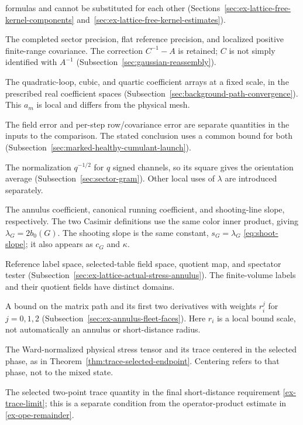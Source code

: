 \begin{description}
formulas and cannot be substituted for each other
(Sections~\ref{sec:ex-lattice-free-kernel-components} and~\ref{sec:ex-lattice-free-kernel-estimates}).
\item[$A$, $A_0$, $C$ in Gaussian reassembly] The completed sector
precision, flat reference precision, and localized positive finite-range
covariance. The correction $C^{-1}-A$ is retained; $C$ is not simply
identified with $A^{-1}$ (Subsection~\ref{sec:gaussian-reassembly}).
\item[$a_m,b_m,c_m$ in background paths] The quadratic-loop, cubic,
and quartic coefficient arrays at a fixed scale, in the prescribed
real coefficient spaces (Subsection~\ref{sec:background-path-convergence}).
This $a_m$ is local and differs from the physical mesh.
\item[$\varepsilon$ in the healthy-field comparison] The field error and
per-step row/covariance error are separate quantities in the inputs to the
comparison. The stated conclusion uses a common bound for both
(Subsection~\ref{sec:marked-healthy-cumulant-launch}).
\item[$\lambda$ in the sector calculation] The normalization $q^{-1/2}$
for $q$ signed channels, so its square gives the orientation average
(Subsection~\ref{sec:sector-gram}). Other local uses of $\lambda$ are
introduced separately.
\item[$\lambda_G$, $b_0(G)$, $s_G$] The annulus coefficient,
canonical running coefficient, and shooting-line slope, respectively.
The two Casimir definitions use the same color inner product, giving
$\lambda_G=2b_0(G)$. The shooting slope is the same constant,
$s_G=\lambda_G$ \eqref{eq:shoot-slope}; it also appears as $c_G$ and
$\kappa$.
\item[$E_d$, $\mathcal F_d$, $\pi_d$, $\tau_{I,D}$ in the annulus]
Reference label space, selected-table field space, quotient map, and
spectator tester (Subsection~\ref{sec:ex-lattice-actual-stress-annulus}).
The finite-volume labels and their quotient fields have distinct domains.
\item[$\mathsf P_r(M;C)$ in the annular estimate] A bound on the matrix path and its first two
derivatives with weights $r_i^j$ for $j=0,1,2$
(Subsection~\ref{sec:ex-annulus-fleet-faces}). Here $r_i$ is a local bound
scale, not automatically an annulus or short-distance radius.
\item[$T_{\mu\nu}$, $\Theta$] The Ward-normalized physical stress
tensor and its trace centered in the selected phase, as in
Theorem~\ref{thm:trace-selected-endpoint}. Centering refers to that
phase, not to the mixed state.
\item[$T(r)$] The selected two-point trace quantity in the final
short-distance requirement \eqref{ex-trace-limit}; this is a separate
condition from the operator-product estimate in \eqref{ex-ope-remainder}.
\end{description}
